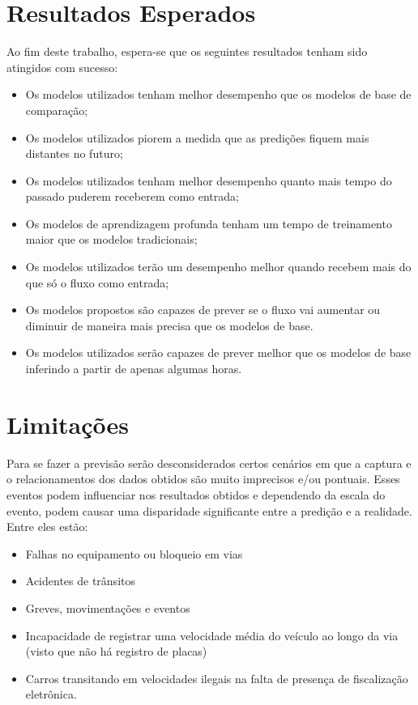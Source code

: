 \section{Resultados Esperados} %

Ao fim deste trabalho, espera-se que os seguintes resultados tenham sido atingidos com sucesso:

\begin{itemize}
    \item  Os modelos utilizados tenham melhor desempenho que os modelos de base de comparação;
    \item Os modelos utilizados piorem a medida que as predições fiquem mais distantes no futuro;
    \item Os modelos utilizados tenham melhor desempenho quanto mais tempo do passado puderem receberem como entrada;
    \item Os modelos de aprendizagem profunda tenham um tempo de treinamento maior que os modelos tradicionais;
    \item Os modelos utilizados terão um desempenho melhor quando recebem mais do que só o fluxo como entrada;
    \item Os modelos propostos são capazes de prever se o fluxo vai aumentar ou diminuir de maneira mais precisa que os modelos de base.
    \item Os modelos utilizados serão capazes de prever melhor que os modelos de base inferindo a partir de apenas algumas horas.
\end{itemize}

\section{Limitações}
Para se fazer a previsão serão desconsiderados certos cenários em que a captura e o relacionamentos dos dados obtidos são muito imprecisos e/ou pontuais. Esses eventos podem influenciar nos resultados obtidos e dependendo da escala do evento, podem causar uma disparidade significante entre a predição e a realidade. Entre eles estão:

\begin{itemize}
    \item Falhas no equipamento ou bloqueio em vias
    \item Acidentes de trânsitos
    \item Greves, movimentações e eventos
    \item Incapacidade de registrar uma velocidade média do veículo ao longo da via (visto que não há registro de placas)
    \item Carros transitando em velocidades ilegais na falta de presença de fiscalização eletrônica.
\end{itemize}

